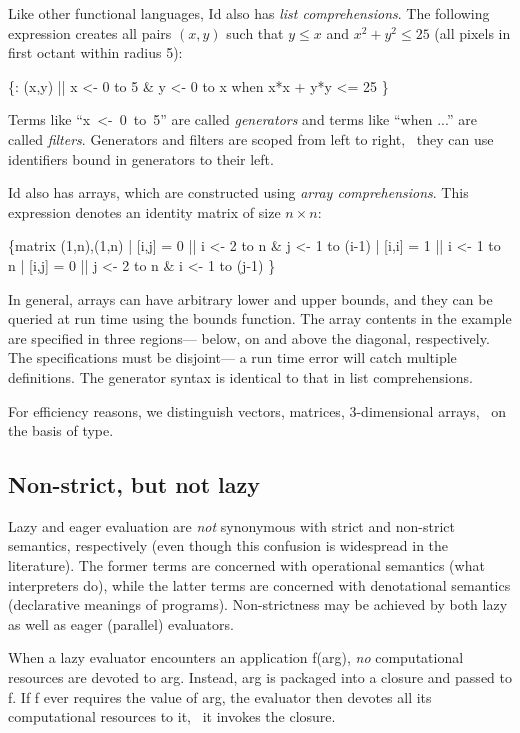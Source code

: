 Like other functional languages, Id also has {\em list
comprehensions\/}.  The following expression creates all pairs $(x,y)$
such that $y \leq x$ and $x^2+y^2 \leq 25$ (all pixels in first octant
within radius 5):

\beginid
\{: (x,y) || x <- 0 to 5 & y <- 0 to x when x*x + y*y <= 25 \}
\endid

Terms like ``\mbox{\cf x <- 0 to 5}'' are called {\em generators\/}
and terms like ``{\cf when ...}'' are called {\em filters\/}.
Generators and filters are scoped from left to right, \ie\ they can
use identifiers bound in generators to their left.

Id also has arrays, which are constructed using {\em array
comprehensions\/}.  This expression denotes an identity matrix of size
$n \times n$:

\beginid
\{matrix (1,n),(1,n)
| [i,j] = 0 || i <- 2 to n & j <- 1 to (i-1)          %
| [i,i] = 1 || i <- 1 to n                            %
| [i,j] = 0 || j <- 2 to n & i <- 1 to (j-1) \}        %
\endid

In general, arrays can have arbitrary lower and upper bounds, and they
can be queried at run time using the {\cf bounds} function.  The array
contents in the example are specified in three regions--- below, on
and above the diagonal, respectively.  The specifications must be
disjoint--- a run time error will catch multiple definitions.  The
generator syntax is identical to that in list comprehensions.

For efficiency reasons, we distinguish vectors, matrices,
3-dimensional arrays, \etc\ on the basis of type.

\subsection{Non-strict, but not lazy}

Lazy and eager evaluation are {\em not\/} synonymous with strict and
non-strict semantics, respectively (even though this confusion is
widespread in the literature).  The former terms are concerned with
operational semantics (what interpreters do), while the latter terms
are concerned with denotational semantics (declarative meanings of
programs).  Non-strictness may be achieved by both lazy as well as
eager (parallel) evaluators.

When a lazy evaluator encounters an application {\cf f(arg)}, {\em
no\/} computational resources are devoted to {\cf arg}.  Instead, {\cf
arg} is packaged into a closure and passed to {\cf f}.  If {\cf f}
ever requires the value of {\cf arg}, the evaluator then devotes all
its computational resources to it, \ie\ it invokes the closure.

